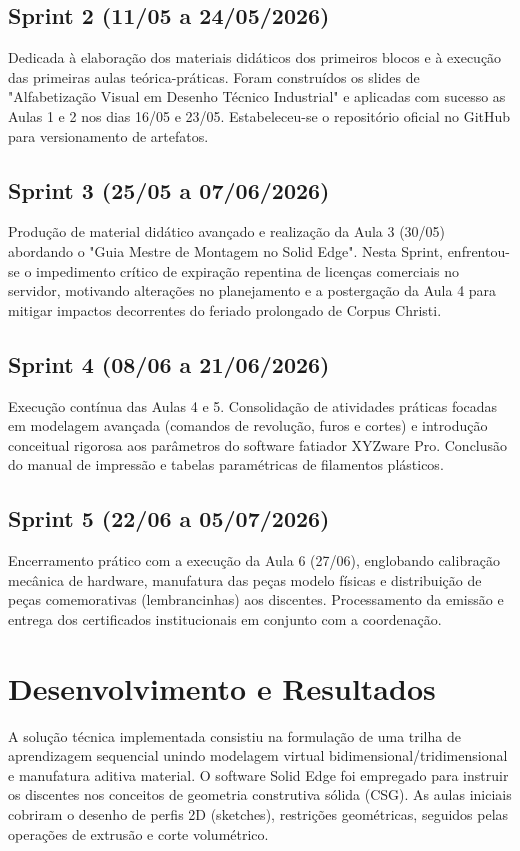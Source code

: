 \documentclass[12pt,a4paper]{article}
\begin{document}
\subsection{Sprint 2 (11/05 a 24/05/2026)}
Dedicada à elaboração dos materiais didáticos dos primeiros blocos e à execução das primeiras aulas teórica-práticas. Foram construídos os slides de "Alfabetização Visual em Desenho Técnico Industrial" e aplicadas com sucesso as Aulas 1 e 2 nos dias 16/05 e 23/05. Estabeleceu-se o repositório oficial no GitHub para versionamento de artefatos.

\subsection{Sprint 3 (25/05 a 07/06/2026)}
Produção de material didático avançado e realização da Aula 3 (30/05) abordando o "Guia Mestre de Montagem no Solid Edge". Nesta Sprint, enfrentou-se o impedimento crítico de expiração repentina de licenças comerciais no servidor, motivando alterações no planejamento e a postergação da Aula 4 para mitigar impactos decorrentes do feriado prolongado de Corpus Christi.

\subsection{Sprint 4 (08/06 a 21/06/2026)}
Execução contínua das Aulas 4 e 5. Consolidação de atividades práticas focadas em modelagem avançada (comandos de revolução, furos e cortes) e introdução conceitual rigorosa aos parâmetros do software fatiador XYZware Pro. Conclusão do manual de impressão e tabelas paramétricas de filamentos plásticos.

\subsection{Sprint 5 (22/06 a 05/07/2026)}
Encerramento prático com a execução da Aula 6 (27/06), englobando calibração mecânica de hardware, manufatura das peças modelo físicas e distribuição de peças comemorativas (lembrancinhas) aos discentes. Processamento da emissão e entrega dos certificados institucionais em conjunto com a coordenação.

\section{Desenvolvimento e Resultados}
A solução técnica implementada consistiu na formulação de uma trilha de aprendizagem sequencial unindo modelagem virtual bidimensional/tridimensional e manufatura aditiva material. O software Solid Edge foi empregado para instruir os discentes nos conceitos de geometria construtiva sólida (CSG). As aulas iniciais cobriram o desenho de perfis 2D (sketches), restrições geométricas, seguidos pelas operações de extrusão e corte volumétrico.
\end{document}
